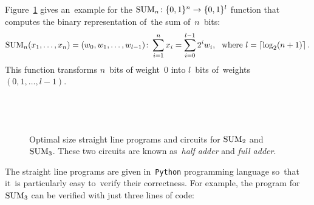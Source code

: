 Figure~\ref{figure:sum23} gives an~example for
the
$\operatorname{SUM}_n \colon \{0,1\}^n \to \{0,1\}^l$ function
that computes the binary representation of~the sum of~$n$~bits:
\[\operatorname{SUM}_n(x_1, \dotsc, x_n)=(w_0, w_1, \dotsc, w_{l-1})\colon \sum_{i=1}^{n}x_i=\sum_{i=0}^{l-1}2^iw_i \text{, \, where } l=\lceil \log_2(n+1)\rceil \, .\]
This function transforms $n$~bits
of weight~0 into $l$~bits
of~weights $(0,1,\dotsc,l-1)$.
%
\begin{figure}[!ht]
\begin{minipage}{.28\textwidth}
\inputminted[firstline=15,lastline=18]{python}{../tutorial.py}
\end{minipage}
\begin{minipage}{.18\textwidth}
\end{minipage}
\begin{minipage}{.33\textwidth}
\inputminted[firstline=22,lastline=28]{python}{../tutorial.py}
\end{minipage}
\begin{minipage}{.18\textwidth}
~
\end{minipage}
\caption{Optimal size straight line programs and circuits for $\operatorname{SUM}_2$ and $\operatorname{SUM}_3$. These two circuits are known as~\emph{half adder} and \emph{full adder}.}
\label{figure:sum23}
\end{figure}
%
The straight line
programs are given
in~\texttt{Python} programming language
so~that
it~is particularly easy to~verify their correctness.
For example, the program for $\operatorname{SUM}_3$ can be verified
with just three lines of code:
\inputminted[firstline=32,lastline=36]{python}{../tutorial.py}

